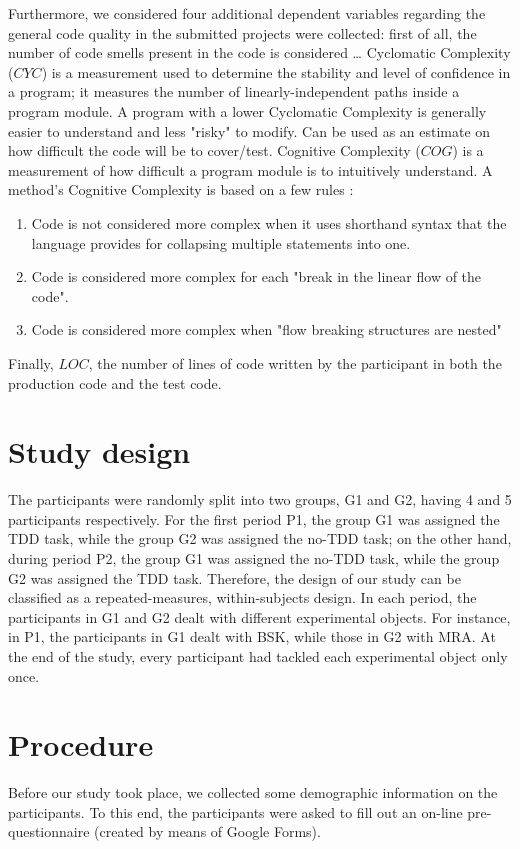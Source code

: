 Furthermore, we considered four additional dependent variables regarding the general code quality in the submitted projects were collected:
first of all, the number of code smells present in the code is considered \dots
Cyclomatic Complexity (\textbf{$CYC$}) is a measurement used to determine the stability and level of confidence in a program; it measures the number of linearly-independent paths inside a program module. A program with a lower Cyclomatic Complexity is generally easier to understand and less "risky" to modify. Can be used as an estimate on how difficult the code will be to cover/test.
Cognitive Complexity (\textbf{$COG$}) is a measurement of how difficult a program module is to intuitively understand. A method's Cognitive Complexity is based on a few rules \cite{CognitiveComplexity}:
\begin{enumerate}
    \item Code is not considered more complex when it uses shorthand syntax that the language provides for collapsing multiple statements into one.
    \item Code is considered more complex for each "break in the linear flow of the code".
    \item Code is considered more complex when "flow breaking structures are nested"
\end{enumerate}

Finally, $LOC$, the number of lines of code written by the participant in both the production code and the test code.



\section{Study design}
The participants were randomly split into two groups, G1 and G2, having 4 and 5 participants respectively. For the first period P1, the group G1 was assigned the TDD task, while the group G2 was assigned the no-TDD task; on the other hand, during period P2, the group G1 was assigned the no-TDD task, while the group G2 was assigned the TDD task.
Therefore, the design of our study can be classified as a repeated-measures, within-subjects design. In each period, the participants in G1 and G2 dealt with different experimental objects. For instance, in P1, the participants in G1 dealt with BSK, while those in G2 with MRA. At the end of the study, every participant had tackled each experimental object only once.

\section{Procedure}
Before our study took place, we collected some demographic information on the participants. To this end, the participants were asked to fill out an on-line pre-questionnaire (created by means of Google Forms).

